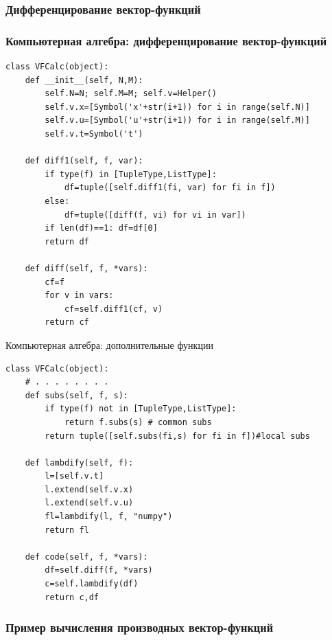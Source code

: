 \documentclass[10pt]{beamer}
\begin{document}
\begin{frame}
  \frametitle{Дифференцирование вектор-функций}

\end{frame}
\begin{frame}[fragile]
  \frametitle{Компьютерная алгебра: дифференцирование вектор-функций}
\begin{lstlisting}
class VFCalc(object):
    def __init__(self, N,M):
        self.N=N; self.M=M; self.v=Helper()
        self.v.x=[Symbol('x'+str(i+1)) for i in range(self.N)]
        self.v.u=[Symbol('u'+str(i+1)) for i in range(self.M)]
        self.v.t=Symbol('t')

    def diff1(self, f, var):
        if type(f) in [TupleType,ListType]:
            df=tuple([self.diff1(fi, var) for fi in f])
        else:
            df=tuple([diff(f, vi) for vi in var])
        if len(df)==1: df=df[0]
        return df

    def diff(self, f, *vars):
        cf=f
        for v in vars:
            cf=self.diff1(cf, v)
        return cf
\end{lstlisting}
\end{frame}
\begin{frame}[fragile]{Компьютерная алгебра: дополнительные функции}
\begin{lstlisting}
class VFCalc(object):
    # . . . . . . . .
    def subs(self, f, s):
        if type(f) not in [TupleType,ListType]:
            return f.subs(s) # common subs
        return tuple([self.subs(fi,s) for fi in f])#local subs

    def lambdify(self, f):
        l=[self.v.t]
        l.extend(self.v.x)
        l.extend(self.v.u)
        fl=lambdify(l, f, "numpy")
        return fl

    def code(self, f, *vars):
        df=self.diff(f, *vars)
        c=self.lambdify(df)
        return c,df
\end{lstlisting}
\end{frame}
\begin{frame}
  \frametitle{Пример вычисления производных вектор-функций}

\end{frame}
\end{document}
